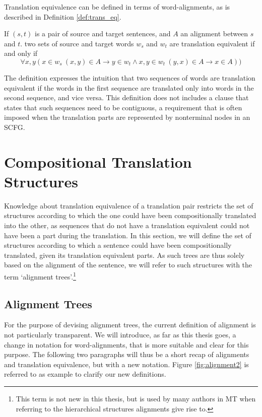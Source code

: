Translation equivalence can be defined in terms of word-alignments, as is described in Definition \ref{def:trans_eq}.

\begin{definition}\label{def:trans_eq}
If $(s,t)$ is a pair of source and target sentences, and $A$ an alignment between $s$ and $t$. two sets of source and target words $w_s$ and $w_t$ are translation equivalent if and only if $$\forall x,y ( x\in w_s~(x,y)\in A \rightarrow y\in w_t \land x,y \in w_t~(y,x)\in A \rightarrow x\in A))$$
\end{definition}

The definition expresses the intuition that two sequences of words are translation equivalent if the words in the first sequence are translated only into words in the second sequence, and vice versa. This definition does not includes a clause that states that such sequences need to be contiguous, a requirement that is often imposed when the translation parts are represented by nonterminal nodes in an SCFG.

\section{Compositional Translation Structures}
\label{sec:comp_structures}

Knowledge about translation equivalence of a translation pair restricts the set of structures according to which the one could have been compositionally translated into the other, as sequences that do not have a translation equivalent could not have been a part during the translation. In this section, we will define the set of structures according to which a sentence could have been compositionally translated, given its translation equivalent parts. As such trees are thus solely based on the alignment of the sentence, we will refer to such structures with the term  `alignment trees'.\footnote{This term is not new in this thesis, but is used by many authors in MT when referring to the hierarchical structures alignments give rise to.}

\subsection{Alignment Trees}
\label{subsec:alignment_trees}

For the purpose of devising alignment trees, the current definition of alignment is not particularly transparent. We will introduce, as far as this thesis goes, a change in notation for word-alignments, that is more suitable and clear for this purpose. The following two paragraphs will thus be a short recap of alignments and translation equivalence, but with a new notation. Figure \ref{fig:alignment2} is referred to as example to clarify our new definitions.

